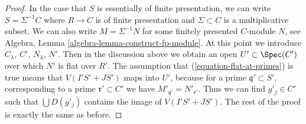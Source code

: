 \begin{proof}
\medskip\noindent
In the case that $S$ is essentially of finite presentation, we can write
$S = \Sigma^{-1}C$ where $R \to C$ is of finite presentation and
$\Sigma \subset C$ is a multiplicative subset. We can also write
$M = \Sigma^{-1}N$ for some finitely presented $C$-module $N$, see
Algebra, Lemma \ref{algebra-lemma-construct-fp-module}.
At this point we introduce $C_\lambda$, $C'$, $N_\lambda$, $N'$. Then in
the discussion above we obtain an open $U' \subset \Spec(C')$
over which $N'$ is flat over $R'$. The assumption that
(\ref{equation-flat-at-primes}) is true means that $V(I'S' + JS')$ maps
into $U'$, because for a prime $\mathfrak q' \subset S'$, corresponding
to a prime $\mathfrak r' \subset C'$ we have
$M'_{\mathfrak q'} = N'_{\mathfrak r'}$. Thus we can find
$g'_j \in C'$ such that $\bigcup D(g'_j)$ contains the image of
$V(I'S' + JS')$. The rest of the proof is exactly the same as before.
\end{proof}
